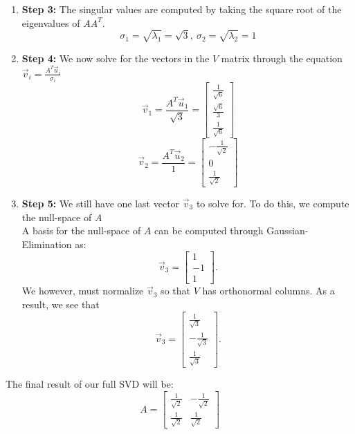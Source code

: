 \begin{enumerate}
{\begin{enumerate}[label=(\roman*)]
        A basis for the null-space of $AA^{T} - I$ is:
        $$\vec{u}_{2} = \begin{bmatrix} -\frac{1}{\sqrt{2}} \\ \frac{1}{\sqrt{2}} \end{bmatrix}$$
        Remember that these vectors form the $U$ matrix.
      \item \textbf{Step 3:}
        The singular values are computed by taking the square root of the eigenvalues of $AA^{T}.$
        $$\sigma_{1} = \sqrt{\lambda_{1}} = \sqrt{3}, \ \sigma_{2} = \sqrt{\lambda_{2}} = 1$$
      \item \textbf{Step 4:}
        We now solve for the vectors in the $V$ matrix through the equation $\vec{v}_i = \frac{A^{T} \vec{u}_i}{\sigma_i}$
        $$\vec{v}_{1} = \frac{A^{T} \vec{u}_{1}}{\sqrt{3}} =
        \begin{bmatrix} \frac{1}{\sqrt{6}} \\ \frac{\sqrt{6}}{3} \\ \frac{1}{\sqrt{6}} \end{bmatrix}$$
        $$\vec{v}_{2} = \frac{A^{T} \vec{u}_{2}}{1} =
        \begin{bmatrix} -\frac{1}{\sqrt{2}} \\ 0 \\ \frac{1}{\sqrt{2}} \end{bmatrix}$$
      \item \textbf{Step 5:}
        We still have one last vector $\vec{v}_{3}$ to solve for. To do this, we compute the null-space of $A$ \\
        A basis for the null-space of $A$ can be computed through Gaussian-Elimination as:
        $$\vec{v}_{3} = \begin{bmatrix} 1 \\ -1 \\ 1 \end{bmatrix}.$$
        We however, must normalize $\vec{v}_{3}$ so that $V$ has orthonormal columns. As a result, we see that
        $$\vec{v}_{3} = \begin{bmatrix} \frac{1}{\sqrt{3}} \\ - \frac{1}{\sqrt{3}} \\ \frac{1}{\sqrt{3}} \end{bmatrix}.$$
    \end{enumerate}
    The final result of our full SVD will be:
    \begin{equation}
      A = \begin{bmatrix} \frac{1}{\sqrt{2}} & -\frac{1}{\sqrt{2}} \\ \frac{1}{\sqrt{2}} & \frac{1}{\sqrt{2}} \end{bmatrix}

\end{equation}}
\end{enumerate}
